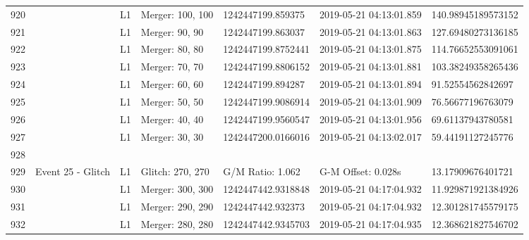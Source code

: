 \begin{longtable}{lllllll}
920  &                                                    &       L1 &  Merger: 100, 100 &   1242447199.859375 &  2019-05-21 04:13:01.859 &  140.98945189573152 \\
921  &                                                    &       L1 &    Merger: 90, 90 &   1242447199.863037 &  2019-05-21 04:13:01.863 &  127.69480273136185 \\
922  &                                                    &       L1 &    Merger: 80, 80 &  1242447199.8752441 &  2019-05-21 04:13:01.875 &  114.76652553091061 \\
923  &                                                    &       L1 &    Merger: 70, 70 &  1242447199.8806152 &  2019-05-21 04:13:01.881 &  103.38249358265436 \\
924  &                                                    &       L1 &    Merger: 60, 60 &   1242447199.894287 &  2019-05-21 04:13:01.894 &   91.52554562842697 \\
925  &                                                    &       L1 &    Merger: 50, 50 &  1242447199.9086914 &  2019-05-21 04:13:01.909 &   76.56677196763079 \\
926  &                                                    &       L1 &    Merger: 40, 40 &  1242447199.9560547 &  2019-05-21 04:13:01.956 &   69.61137943780581 \\
927  &                                                    &       L1 &    Merger: 30, 30 &  1242447200.0166016 &  2019-05-21 04:13:02.017 &   59.44191127245776 \\
928  &                                                    &          &                   &                     &                          &                     \\
929  &                                  Event 25 - Glitch &       L1 &  Glitch: 270, 270 &    G/M Ratio: 1.062 &       G-M Offset: 0.028s &   13.17909676401721 \\
930  &                                                    &       L1 &  Merger: 300, 300 &  1242447442.9318848 &  2019-05-21 04:17:04.932 &  11.929871921384926 \\
931  &                                                    &       L1 &  Merger: 290, 290 &   1242447442.932373 &  2019-05-21 04:17:04.932 &  12.301281745579175 \\
932  &                                                    &       L1 &  Merger: 280, 280 &  1242447442.9345703 &  2019-05-21 04:17:04.935 &  12.368621827546702 \\

\end{longtable}
